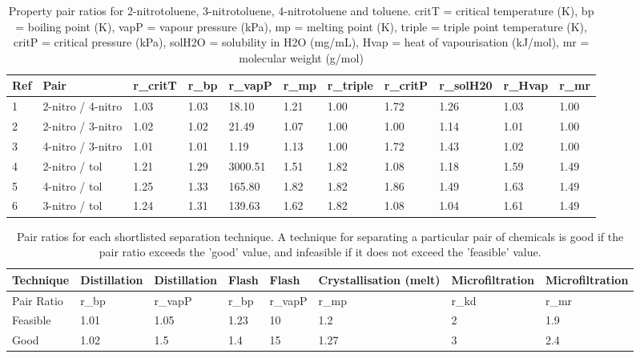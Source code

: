 \begin{landscape}
\begin{table}[H]
\centering
\caption{Property pair ratios for 2-nitrotoluene, 3-nitrotoluene, 4-nitrotoluene and toluene. critT = critical temperature (K), bp = boiling point (K), vapP = vapour pressure (kPa), mp = melting point (K), triple = triple point temperature (K), critP = critical pressure (kPa), solH2O = solubility in H2O (mg/mL), Hvap = heat of vapourisation (kJ/mol), mr = molecular weight (g/mol)}
\label{tab:jaksland}
\begin{tabular}{@{}lllllllllll@{}}
\toprule
Ref & Pair              & r\_critT & r\_bp & r\_vapP & r\_mp & r\_triple & r\_critP & r\_solH20 & r\_Hvap & r\_mr \\ \midrule
1   & 2-nitro / 4-nitro & 1.03     & 1.03  & 18.10   & 1.21  & 1.00      & 1.72     & 1.26      & 1.03    & 1.00  \\
2   & 2-nitro / 3-nitro & 1.02     & 1.02  & 21.49   & 1.07  & 1.00      & 1.00     & 1.14      & 1.01    & 1.00  \\
3   & 4-nitro / 3-nitro & 1.01     & 1.01  & 1.19    & 1.13  & 1.00      & 1.72     & 1.43      & 1.02    & 1.00  \\
4   & 2-nitro / tol     & 1.21     & 1.29  & 3000.51 & 1.51  & 1.82      & 1.08     & 1.18      & 1.59    & 1.49  \\
5   & 4-nitro / tol     & 1.25     & 1.33  & 165.80  & 1.82  & 1.82      & 1.86     & 1.49      & 1.63    & 1.49  \\
6   & 3-nitro / tol     & 1.24     & 1.31  & 139.63  & 1.62  & 1.82      & 1.08     & 1.04      & 1.61    & 1.49  \\ \bottomrule
\end{tabular}
\end{table}


\begin{table}[H]
\centering
\caption{Pair ratios for each shortlisted separation technique. A technique for separating a particular pair of chemicals is good if the pair ratio exceeds the 'good' value, and infeasible if it does not exceed the 'feasible' value.}
\label{tab:separation pair ratio}
\begin{tabular}{@{}llllllll@{}}
\toprule
Technique  & Distillation & Distillation & Flash & Flash   & Crystallisation (melt) & Microfiltration & Microfiltration \\ \midrule
Pair Ratio & r\_bp        & r\_vapP      & r\_bp & r\_vapP & r\_mp                  & r\_kd           & r\_mr           \\
Feasible   & 1.01         & 1.05         & 1.23  & 10      & 1.2                    & 2               & 1.9             \\
Good       & 1.02         & 1.5          & 1.4   & 15      & 1.27                   & 3               & 2.4             \\ \bottomrule
\end{tabular}
\end{table}



\end{landscape}
